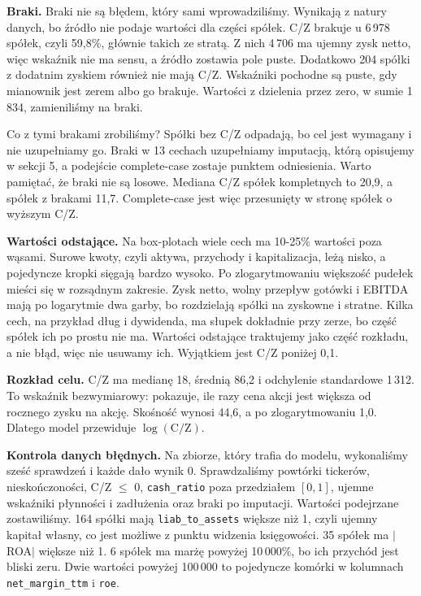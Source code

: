 ﻿\documentclass[10pt,twocolumn,a4paper]{article}
\begin{document}
\textbf{Braki.} Braki nie są błędem, który sami wprowadziliśmy. Wynikają z natury danych, bo źródło nie podaje wartości dla części spółek. C/Z brakuje u 6\,978 spółek, czyli 59,8\%, głównie takich ze stratą. Z nich 4\,706 ma ujemny zysk netto, więc wskaźnik nie ma sensu, a źródło zostawia pole puste. Dodatkowo 204 spółki z dodatnim zyskiem również nie mają C/Z. Wskaźniki pochodne są puste, gdy mianownik jest zerem albo go brakuje. Wartości z dzielenia przez zero, w sumie 1\,834, zamieniliśmy na braki.

Co z tymi brakami zrobiliśmy? Spółki bez C/Z odpadają, bo cel jest wymagany i nie uzupełniamy go. Braki w 13 cechach uzupełniamy imputacją, którą opisujemy w sekcji 5, a podejście complete-case zostaje punktem odniesienia. Warto pamiętać, że braki nie są losowe. Mediana C/Z spółek kompletnych to 20,9, a spółek z brakami 11,7. Complete-case jest więc przesunięty w stronę spółek o wyższym C/Z.

\textbf{Wartości odstające.} Na box-plotach wiele cech ma 10-25\% wartości poza wąsami. Surowe kwoty, czyli aktywa, przychody i kapitalizacja, leżą nisko, a pojedyncze kropki sięgają bardzo wysoko. Po zlogarytmowaniu większość pudełek mieści się w rozsądnym zakresie. Zysk netto, wolny przepływ gotówki i EBITDA mają po logarytmie dwa garby, bo rozdzielają spółki na zyskowne i stratne. Kilka cech, na przykład dług i dywidenda, ma słupek dokładnie przy zerze, bo część spółek ich po prostu nie ma. Wartości odstające traktujemy jako część rozkładu, a nie błąd, więc nie usuwamy ich. Wyjątkiem jest C/Z poniżej 0,1.

\textbf{Rozkład celu.} C/Z ma medianę 18, średnią 86,2 i odchylenie standardowe 1\,312. To wskaźnik bezwymiarowy: pokazuje, ile razy cena akcji jest większa od rocznego zysku na akcję. Skośność wynosi 44,6, a po zlogarytmowaniu 1,0. Dlatego model przewiduje $\log(\text{C/Z})$.

\textbf{Kontrola danych błędnych.} Na zbiorze, który trafia do modelu, wykonaliśmy sześć sprawdzeń i każde dało wynik 0. Sprawdzaliśmy powtórki tickerów, nieskończoności, C/Z $\le$ 0, \texttt{cash\_ratio} poza przedziałem $[0,1]$, ujemne wskaźniki płynności i zadłużenia oraz braki po imputacji. Wartości podejrzane zostawiliśmy. 164 spółki mają \texttt{liab\_to\_assets} większe niż 1, czyli ujemny kapitał własny, co jest możliwe z punktu widzenia księgowości. 35 spółek ma $|$ROA$|$ większe niż 1. 6 spółek ma marżę powyżej 10\,000\%, bo ich przychód jest bliski zeru. Dwie wartości powyżej 100\,000 to pojedyncze komórki w kolumnach \texttt{net\_margin\_ttm} i \texttt{roe}.
\end{document}
